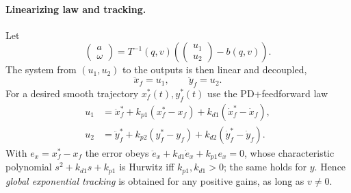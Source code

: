 \documentclass[11pt,a4paper]{article}
\def\boldsymbol#1{#1}%
\newcommand{\q}{\boldsymbol{q}}
\newcommand{\Tm}{\boldsymbol{T}}
\newcommand{\bb}{\boldsymbol{b}}
\theoremstyle{definition}
\theoremstyle{plain}
\theoremstyle{remark}
\begin{document}
\paragraph{Linearizing law and tracking.} Let
\begin{equation}
  \begin{pmatrix}a\\ \omega\end{pmatrix}=\Tm^{-1}(\q,v)\left(\begin{pmatrix}u_1\\u_2\end{pmatrix}-\bb(\q,v)\right).
  \label{eq:fl}
\end{equation}
The system from $(u_1,u_2)$ to the outputs is then linear and decoupled,
\[
  \ddot x_f=u_1,\qquad \ddot y_f=u_2 .
\]
For a desired smooth trajectory $x_f^*(t),y_f^*(t)$ use the PD+feedforward law
\begin{align}
  u_1&=\ddot x_f^*+k_{p1}(x_f^*-x_f)+k_{d1}(\dot x_f^*-\dot x_f),\\
  u_2&=\ddot y_f^*+k_{p2}(y_f^*-y_f)+k_{d2}(\dot y_f^*-\dot y_f).
\end{align}
With $e_x=x_f^*-x_f$ the error obeys $\ddot e_x+k_{d1}\dot e_x+k_{p1}e_x=0$, whose characteristic polynomial $s^2+k_{d1}s+k_{p1}$ is Hurwitz iff $k_{p1},k_{d1}>0$; the same holds for $y$. Hence \emph{global exponential tracking} is obtained for any positive gains, as long as $v\neq0$.
\end{document}
